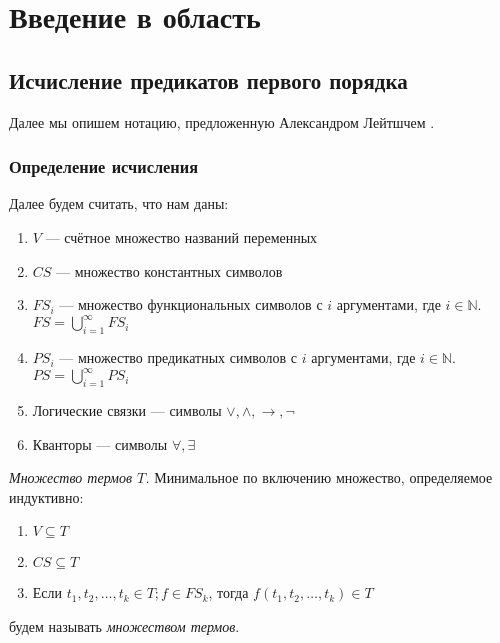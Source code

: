 \chapter{Введение в область}
\startrelatedwork
\label{sec:chap1}

\section{Исчисление предикатов первого порядка}

Далее мы опишем нотацию, предложенную Александром Лейтшчем \cite{Leitsch:1997:RC:260906}.

\subsection{Определение исчисления}

Далее будем считать, что нам даны:
\begin{enumerate}
	\item $V$    --- счётное множество названий переменных
    \item $CS$   --- множество константных символов
    \item $FS_i$ --- множество функциональных символов с $i$ аргументами, где $i \in \mathbb{N}$. \\
    $FS = \bigcup\limits_{i=1}^{\infty} FS_{i}$
    \item $PS_i$ --- множество предикатных символов с $i$ аргументами, где $i \in \mathbb{N}$. \\
    $PS = \bigcup\limits_{i=1}^{\infty} PS_{i}$
    \item Логические связки --- символы $\vee, \wedge, \rightarrow, \neg$
    \item Кванторы --- символы $\forall, \exists$
\end{enumerate}



\begin{definition}
  \emph{Множество термов $T$.} Минимальное по включению множество, определяемое индуктивно:
  \begin{enumerate}
  	\item $V \subseteq T$
    \item $CS \subseteq T$
    \item Если $t_1, t_2, \ldots, t_k \in T; f \in FS_k$, тогда $f(t_1, t_2, \ldots, t_k) \in T$
  \end{enumerate}
  будем называть \emph{множеством термов}.
\end{definition}

